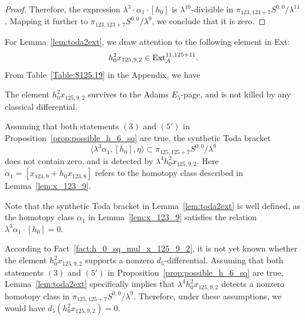 \documentclass{amsart}
\numberwithin{equation}{section}
\begin{document}
\begin{proof}
Therefore, the expression $\lambda^3 \cdot \alpha_1 \cdot [h_0]$ is $\lambda^{10}$-divisible in $\pi_{123,123+7} S^{0,0}/\lambda^{11}$. Mapping it further to $\pi_{123,123+7} S^{0,0}/\lambda^9$, we conclude that it is zero. 
\end{proof}


%
%

%

%
%

%
%
%
%


For Lemma~\ref{lem:toda2ext}, we draw attention to the following element in Ext:
$$h_0^2x_{125,9,2} \in \mathrm{Ext}_A^{11, 125+11}.$$
From Table~\ref{Table:S125.19} in the Appendix, we have
\begin{fact} \label{fact:h_0_sq_mul_x_125_9_2}\label{fact:h02x1259}
    The element $h_0^2x_{125,9,2}$ survives to the Adams $E_5$-page, and is not killed by any classical differential.
\end{fact}

\begin{lemma} \label{lem:toda2ext}
    Assuming that both statements $(3)$ and $(5')$ in Proposition~\ref{prop:possible_h_6_sq} are true, the synthetic Toda bracket
$$\langle \lambda^3 \alpha_1, [h_0], \eta \rangle \subset \pi_{125,125+7} S^{0,0}/\lambda^9$$
    does not contain zero, and is detected by $\lambda^4 h_0^2x_{125,9,2}$. Here $\alpha_1 = [x_{123,9}+h_0x_{123,8}]$ refers to the homotopy class described in Lemma~\ref{lem:x_123_9}.
\end{lemma}

Note that the synthetic Toda bracket in Lemma~\ref{lem:toda2ext} is well defined, as the homotopy class $\alpha_1$ in Lemma~\ref{lem:x_123_9} satisfies the relation $\lambda^3 \alpha_1 \cdot [h_0] = 0$.

\begin{remark} \label{rem:h_0_sq_mul_x_125_9_2}\label{rem:h02x1259}
    According to Fact~\ref{fact:h_0_sq_mul_x_125_9_2}, it is not yet known whether the element $h_0^2x_{125,9,2}$ supports a nonzero $d_5$-differential. Assuming that both statements $(3)$ and $(5')$ in Proposition~\ref{prop:possible_h_6_sq} are true, Lemma~\ref{lem:toda2ext} specifically implies that $\lambda^4 h_0^2x_{125,9,2}$ detects a nonzero homotopy class in $\pi_{125,125+7} S^{0,0}/\lambda^9$. Therefore, under these assumptions, we would have $d_5(h_0^2x_{125,9,2}) = 0$. 
\end{remark}
\end{document}
